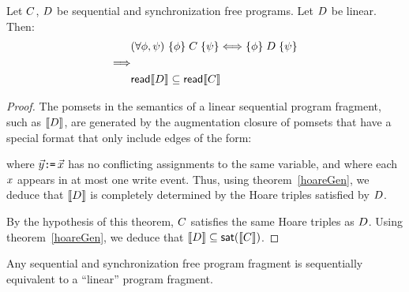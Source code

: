 \begin{theorem}\label{seqcompleteness}
Let $C$, $D$ be sequential and synchronization free programs.  Let $D$ be linear.  Then:
\begin{align*}
& (\forall \phi,\psi) \ \{\phi\}\allowbreak\;C\;\allowbreak\{\psi\} \Longleftrightarrow \{\phi\}\allowbreak\;D\;\allowbreak\{\psi\}  \\
\Longrightarrow & \\
& {\mathsf{read}}{\llbracket D\rrbracket} \subseteq {\mathsf{read}}{\llbracket C\rrbracket} 
\end{align*}
\begin{proof}
The pomsets in the semantics of a linear sequential program fragment, such as $\llbracket D\rrbracket$, are generated by the augmentation closure of pomsets that have a special format that only include edges of the form: \begin{tikzdisplay}[node distance=1em]
\end{tikzdisplay}
where $\vec{y}\texttt{:}\mkern-1mu\texttt{=}\, \vec{x}$ has no conflicting assignments to the same variable, and where each $x$ appears in at most one write event. Thus, using  theorem~\ref{hoareGen}, we deduce that $\llbracket D\rrbracket$ is completely determined by the Hoare triples satisfied by $D$.  

By the hypothesis of this theorem, $C$ satisfies the same Hoare triples as $D$.  Using  theorem~\ref{hoareGen}, we deduce that $\llbracket D\rrbracket \subseteq \mathsf{sat}(\llbracket C\rrbracket)$. 
\end{proof}
\end{theorem}
Any sequential and synchronization free  program fragment is sequentially equivalent to a ``linear'' program fragment.  

